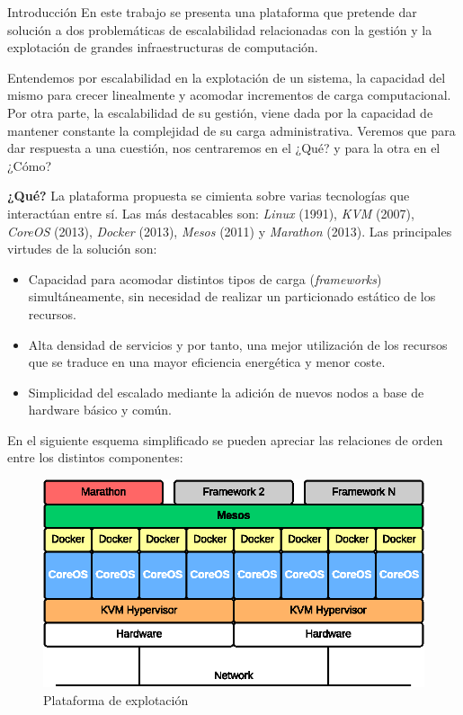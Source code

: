 \documentclass[a4paper,12pt,spanish,final]{epsc_tfc_pfc}
\begin{document}
\begin{intro}{Introducción}
En este trabajo se presenta una plataforma que pretende dar solución a dos problemáticas de escalabilidad relacionadas con la gestión y la explotación de grandes infraestructuras de computación.

Entendemos por escalabilidad en la explotación de un sistema, la capacidad del mismo para crecer linealmente y acomodar incrementos de carga computacional. Por otra parte, la escalabilidad de su gestión, viene dada por la capacidad de mantener constante la complejidad de su carga administrativa. Veremos que para dar respuesta a una cuestión, nos centraremos en el ¿Qué? y para la otra en el ¿Cómo?

\textbf{¿Qué?} La plataforma propuesta se cimienta sobre varias tecnologías que interactúan entre sí. Las más destacables son: \emph{Linux} (1991), \emph{KVM} (2007), \emph{CoreOS} (2013), \emph{Docker} (2013), \emph{Mesos} (2011) y \emph{Marathon} (2013). Las principales virtudes de la solución son:
\begin{itemize}
  \item Capacidad para acomodar distintos tipos de carga (\emph{frameworks}) simultáneamente, sin necesidad de realizar un particionado estático de los recursos.
  \item Alta densidad de servicios y por tanto, una mejor utilización de los recursos que se traduce en una mayor eficiencia energética y menor coste.
  \item Simplicidad del escalado mediante la adición de nuevos nodos a base de hardware básico y común.
\end{itemize}

En el siguiente esquema simplificado se pueden apreciar las relaciones de orden entre los distintos componentes:\\

\begin{figure}[h]
  \centering
    \includegraphics[scale=1]{plataforma}
      \caption{Plataforma de explotación}
\end{figure}


\end{intro}
\end{document}
